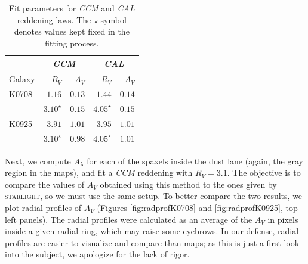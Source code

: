 \documentclass[a4paper]{article}
\def\starlight{\textsc{starlight}\xspace}
\def\CCM{\textit{CCM}\xspace}
\def\CAL{\textit{CAL}\xspace}
\begin{document}
\begin{table}
\caption{Fit parameters for \CCM and \CAL reddening laws. The $\star$ symbol
denotes values kept fixed in the fitting process.}
\label{tab:params}
\begin{center}
\begin{tabular}{l | r r | r r}
\hline
       & \multicolumn{2}{c}{\CCM} & \multicolumn{2}{c}{\CAL} \\
\hline
Galaxy & $R_V$        & $A_V$           & $R_V$        & $A_V$  \\
\hline
K0708  & $1.16$       & $0.13$          & $1.44$       & $0.14$ \\
       & $3.10^\star$ & $0.15$          & $4.05^\star$ & $0.15$ \\
K0925  & $3.91$       & $1.01$          & $3.95$       & $1.01$ \\
       & $3.10^\star$ & $0.98$          & $4.05^\star$ & $1.01$ \\
\hline
\end{tabular}
\end{center}
\end{table}

Next, we compute $A_\lambda$ for each of the spaxels inside the dust lane
(again, the gray region in the maps), and fit a \CCM reddening with $R_V = 3.1$.
The objective is to compare the values of $A_V$ obtained using this method to
the ones given by \starlight, so we must use the same setup. To better compare
the two results, we plot radial profiles of $A_V$ (Figures
\ref{fig:radprofK0708} and \ref{fig:radprofK0925}, top left panels). The radial
profiles were calculated as an average of the $A_V$ in pixels inside a given
radial ring, which may raise some eyebrows. In our defense, radial profiles are
easier to visualize and compare than maps; as this is just a first look into the
subject, we apologize for the lack of rigor.
\end{document}
